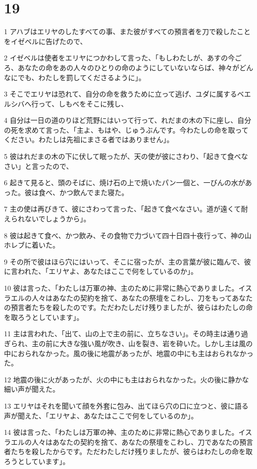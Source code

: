 \chapter{19}

\par 1 アハブはエリヤのしたすべての事、また彼がすべての預言者を刀で殺したことをイゼベルに告げたので、
\par 2 イゼベルは使者をエリヤにつかわして言った、「もしわたしが、あすの今ごろ、あなたの命をあの人々のひとりの命のようにしていないならば、神々がどんなにでも、わたしを罰してくださるように」。
\par 3 そこでエリヤは恐れて、自分の命を救うために立って逃げ、ユダに属するベエルシバへ行って、しもべをそこに残し、
\par 4 自分は一日の道のりほど荒野にはいって行って、れだまの木の下に座し、自分の死を求めて言った、「主よ、もはや、じゅうぶんです。今わたしの命を取ってください。わたしは先祖にまさる者ではありません」。
\par 5 彼はれだまの木の下に伏して眠ったが、天の使が彼にさわり、「起きて食べなさい」と言ったので、
\par 6 起きて見ると、頭のそばに、焼け石の上で焼いたパン一個と、一びんの水があった。彼は食べ、かつ飲んでまた寝た。
\par 7 主の使は再びきて、彼にさわって言った、「起きて食べなさい。道が遠くて耐えられないでしょうから」。
\par 8 彼は起きて食べ、かつ飲み、その食物で力づいて四十日四十夜行って、神の山ホレブに着いた。
\par 9 その所で彼はほら穴にはいって、そこに宿ったが、主の言葉が彼に臨んで、彼に言われた、「エリヤよ、あなたはここで何をしているのか」。
\par 10 彼は言った、「わたしは万軍の神、主のために非常に熱心でありました。イスラエルの人々はあなたの契約を捨て、あなたの祭壇をこわし、刀をもってあなたの預言者たちを殺したのです。ただわたしだけ残りましたが、彼らはわたしの命を取ろうとしています」。
\par 11 主は言われた、「出て、山の上で主の前に、立ちなさい」。その時主は通り過ぎられ、主の前に大きな強い風が吹き、山を裂き、岩を砕いた。しかし主は風の中におられなかった。風の後に地震があったが、地震の中にも主はおられなかった。
\par 12 地震の後に火があったが、火の中にも主はおられなかった。火の後に静かな細い声が聞えた。
\par 13 エリヤはそれを聞いて顔を外套に包み、出てほら穴の口に立つと、彼に語る声が聞えた、「エリヤよ、あなたはここで何をしているのか」。
\par 14 彼は言った、「わたしは万軍の神、主のために非常に熱心でありました。イスラエルの人々はあなたの契約を捨て、あなたの祭壇をこわし、刀であなたの預言者たちを殺したからです。ただわたしだけ残りましたが、彼らはわたしの命を取ろうとしています」。
